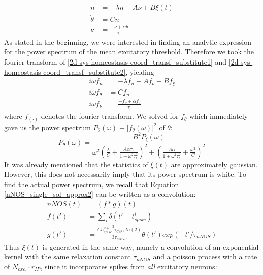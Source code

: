 \documentclass[10pt,a4paper]{article}
\begin{document}
\begin{align}
\dot{n} &= -\lambda n + A \nu + B \xi (t) \label{2d-sys-homeostasis-coord_transf_substitute1} \\
\dot{\theta} &= Cn \label{2d-sys-homeostasis-coord_transf_substitute2} \\
\dot{\nu} &= \frac{-\nu + \alpha \theta}{\tau_r} \label{2d-sys-homeostasis-coord_transf_substitute3}
\end{align}
As stated in the beginning, we were interested in finding an analytic expression for the power spectrum of the mean excitatory threshold. Therefore we took the fourier transform of \eqref{2d-sys-homeostasis-coord_transf_substitute1} and \eqref{2d-sys-homeostasis-coord_transf_substitute2}, yielding
\begin{align}
i\omega f_n &= - \lambda f_n + A f_\nu + B f_\xi \label{2d-sys-homeostasis-coord_transf_substitute_ft1}\\
i\omega f_\theta &= C f_n \label{2d-sys-homeostasis-coord_transf_substitute_ft2} \\
i\omega f_\nu &= \frac{-f_\nu + \alpha f_\theta}{\tau_r} \label{2d-sys-homeostasis-coord_transf_substitute_ft3}
\end{align}
where $f_{(\cdot)}$ denotes the fourier transform. We solved for $f_\theta$ which immediately gave us the power spectrum $P_\theta (\omega) \equiv |f_\theta (\omega)|^2$ of $\theta$:
\begin{equation}
P_\theta (\omega) = \frac{B^2 P_\xi (\omega)}{\omega^2 \left( \frac{\lambda}{C} + \frac{A\alpha \tau_r}{1+\omega^2 \tau_r^2}\right)^2  + \left(         \frac{A\alpha}{1+\omega^2\tau_r^2} + \frac{\omega^2}{C}\right)^2}
\end{equation}
It was already mentioned that the statistics of $\xi(t)$ are approximately gaussian. However, this does not necessarily imply that its power spectrum is white. To find the actual power spectrum, we recall that Equation \eqref{nNOS_single_sol_approx2} can be written as a convolution:
\begin{align}
nNOS(t) &= \left(f \ast g\right)(t) \label{Noise_Pow_Spec_Conv1_1} \\
f(t') &= \sum_i \delta(t' - t^i_{spike}) \label{Noise_Pow_Spec_Conv1_2} \\
g(t') &= \frac{{Ca^{2+}_{spike}}^3 \tau_{Ca^{2+}}ln(2)}{3\tau_{nNOS}} \theta(t') exp(-t'/\tau_{nNOS}) \label{Noise_Pow_Spec_Conv1_3}
\end{align}
Thus $\xi(t)$ is generated in the same way, namely a convolution of an exponential kernel with the same relaxation constant $\tau_{nNOS}$ and a poisson process with a rate of $N_{exc.}\cdot r_{IP}$, since it incorporates spikes from \emph{all} excitatory neurons:
\end{document}
